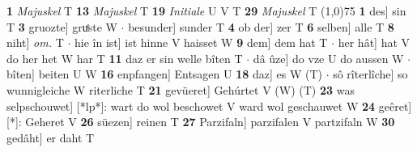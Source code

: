 \documentclass[8pt,a4paper,notitlepage]{article}
\begin{document}
\begin{table}[ht]
\begin{minipage}[t]{0.5\linewidth}
\textbf{1} \textit{Majuskel} T  \textbf{13} \textit{Majuskel} T  \textbf{19} \textit{Initiale} U V T  \textbf{29} \textit{Majuskel} T  \newline
\line(1,0){75} \newline
\textbf{1} des] sin T \textbf{3} gruozte] gruͤste W  $\cdot$ besunder] sunder T \textbf{4} ob der] zer T \textbf{6} selben] alle T \textbf{8} niht] \textit{om.} T  $\cdot$ hie în ist] ist hinne V haisset W \textbf{9} dem] dem hat T  $\cdot$ her hât] hat V do her het W har T \textbf{11} daz er sin welle bîten T  $\cdot$ dâ ûze] do vze U do aussen W  $\cdot$ bîten] beiten U W \textbf{16} enpfangen] Entsagen U \textbf{18} daz] es W (T)  $\cdot$ sô rîterlîche] so wunnigleiche W riterliche T \textbf{21} gevüeret] Gehúrtet V (W) (T) \textbf{23} was selpschouwet] [*lp*]: wart do wol beschowet V ward wol geschauwet W \textbf{24} geêret] [*]: Geheret V \textbf{26} süezen] reinen T \textbf{27} Parzifaln] parzifalen V partzifaln W \textbf{30} gedâht] er daht T \newline
\end{minipage}
\end{table}
\end{document}
